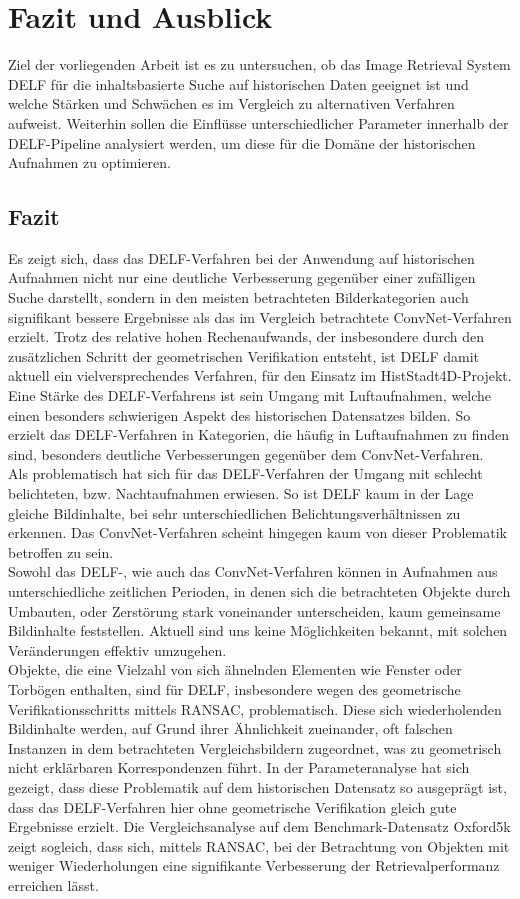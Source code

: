 \chapter{Fazit und Ausblick}

Ziel der vorliegenden Arbeit ist es zu untersuchen, ob das Image Retrieval System DELF für die inhaltsbasierte Suche auf historischen Daten geeignet ist und welche Stärken und Schwächen es im Vergleich zu alternativen Verfahren aufweist. Weiterhin sollen die Einflüsse unterschiedlicher Parameter innerhalb der DELF-Pipeline analysiert werden, um diese für die Domäne der historischen Aufnahmen zu optimieren.
\section{Fazit}
Es zeigt sich, dass das DELF-Verfahren bei der Anwendung auf historischen Aufnahmen nicht nur eine deutliche Verbesserung gegenüber einer zufälligen Suche darstellt, sondern in den meisten betrachteten Bilderkategorien auch signifikant bessere Ergebnisse als das im Vergleich betrachtete ConvNet-Verfahren erzielt. Trotz des relative hohen Rechenaufwands, der insbesondere durch den zusätzlichen Schritt der geometrischen Verifikation entsteht, ist DELF damit aktuell ein vielversprechendes Verfahren, für den Einsatz im HistStadt4D-Projekt.
\\
Eine Stärke des DELF-Verfahrens ist sein Umgang mit Luftaufnahmen, welche einen besonders schwierigen Aspekt des historischen Datensatzes bilden. So erzielt das DELF-Verfahren in Kategorien, die häufig in Luftaufnahmen zu finden sind, besonders deutliche Verbesserungen gegenüber dem ConvNet-Verfahren. 
\\
Als problematisch hat sich für das DELF-Verfahren der Umgang mit schlecht belichteten, bzw. Nachtaufnahmen erwiesen. So ist DELF kaum in der Lage gleiche Bildinhalte, bei sehr unterschiedlichen Belichtungsverhältnissen zu erkennen. Das ConvNet-Verfahren scheint hingegen kaum von dieser Problematik betroffen zu sein.
\\
Sowohl das DELF-, wie auch das ConvNet-Verfahren können in Aufnahmen aus unterschiedliche zeitlichen Perioden, in denen sich die betrachteten Objekte durch Umbauten, oder Zerstörung stark voneinander unterscheiden, kaum gemeinsame Bildinhalte feststellen. Aktuell sind uns keine Möglichkeiten bekannt, mit solchen Veränderungen effektiv umzugehen.
\\
Objekte, die eine Vielzahl von sich ähnelnden Elementen wie Fenster oder Torbögen enthalten, sind für DELF, insbesondere wegen des geometrische Verifikationsschritts mittels RANSAC, problematisch. Diese sich wiederholenden Bildinhalte werden, auf Grund ihrer Ähnlichkeit zueinander, oft falschen Instanzen in dem betrachteten Vergleichsbildern zugeordnet, was zu geometrisch nicht erklärbaren Korrespondenzen führt. In der Parameteranalyse hat sich gezeigt, dass diese Problematik auf dem historischen Datensatz so ausgeprägt ist, dass das DELF-Verfahren hier ohne geometrische Verifikation gleich gute Ergebnisse erzielt. Die Vergleichsanalyse auf dem Benchmark-Datensatz Oxford5k zeigt sogleich, dass sich, mittels RANSAC, bei der Betrachtung von Objekten mit weniger Wiederholungen eine signifikante Verbesserung der Retrievalperformanz erreichen lässt. 
